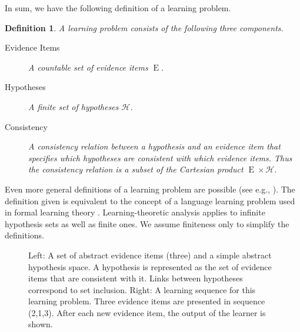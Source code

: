 \documentclass{elsarticle}%
\newtheorem{definition}[theorem]{Definition}
\DeclareMathOperator{\E}{E}
\newcommand{\hypotheses}{\mathcal{H}}
\begin{document}
In sum, we have the following definition of a learning problem.

\begin{definition} \label{def:learn-problem} A learning problem consists of the following three components.
\begin{description}
\item[Evidence Items] A countable set of  evidence items $\E$.
\item[Hypotheses] A finite set of hypotheses $\hypotheses$.
\item[Consistency] A consistency relation between a hypothesis and an evidence item that specifies which hypotheses are consistent with which evidence items. Thus the consistency relation is a subset of the Cartesian product $\E \times \hypotheses$.
\end{description}
\end{definition}
Even more general definitions of a learning problem are possible (see e.g., \cite{Genin2017}). The definition given is equivalent to the concept of a language learning problem used in formal learning theory \cite{jain99:_system_that_learn}.
Learning-theoretic analysis applies to infinite hypothesis sets as well as finite ones. We assume finiteness only to simplify the definitions. 

\begin{figure}[htbp]
\centering
{}
\caption{Left: A set of abstract evidence items (three) and a simple abstract hypothesis space. A hypothesis is represented as the set of evidence items that are consistent with it. Links between hypotheses correspond to set inclusion. Right: A learning sequence for this learning problem. Three evidence items are presented in sequence (2,1,3). After each new evidence item, the output of the learner is shown.}%
\label{fig:problem}%
\end{figure}
\end{document}
